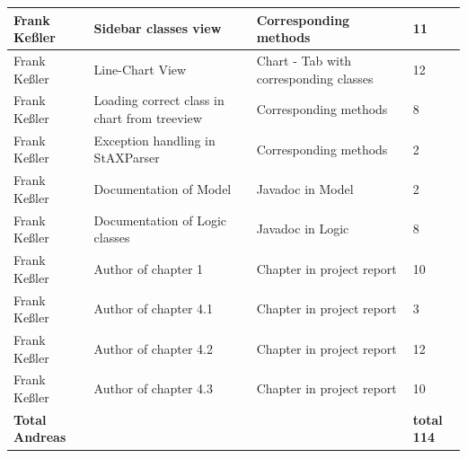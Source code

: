 \begin{table}[!h]
\begin{tabular}{p{2cm}||p{4.2cm}|p{4cm}|l|}
    \hline
    Frank Keßler & Sidebar classes view & Corresponding methods & 11 \\ 
    \hline
    Frank Keßler & Line-Chart View & Chart - Tab with corresponding classes & 12 \\ 
    \hline 
    Frank Keßler & Loading correct class in chart from treeview & Corresponding methods & 8 \\ 
    \hline
    Frank Keßler & Exception handling in StAXParser & Corresponding methods & 2 \\ 
    \hline
    Frank Keßler & Documentation of Model & Javadoc in Model & 2 \\ 
    \hline
    Frank Keßler & Documentation of Logic classes & Javadoc in Logic & 8 \\ 
    \hline
    Frank Keßler & Author of chapter 1 & Chapter in project report & 10 \\ 
    \hline
    Frank Keßler & Author of chapter 4.1 & Chapter in project report & 3 \\ 
    \hline
    Frank Keßler & Author of chapter 4.2 & Chapter in project report & 12 \\
    \hline 
    Frank Keßler & Author of chapter 4.3 & Chapter in project report & 10 \\ 
    \hline
    \hline 
    \textbf{Total \newline Andreas} & & & \textbf{total 114}   \\
    \hline
    \hline
  \end{tabular}
\end{table}
